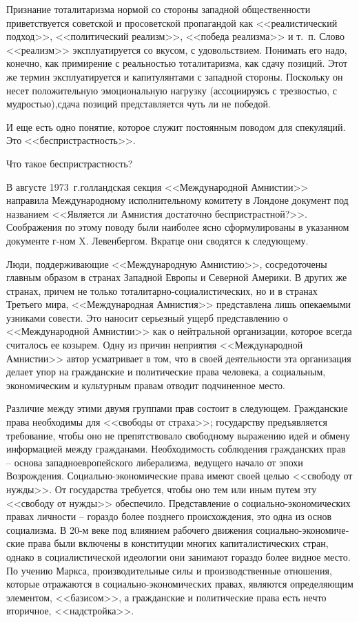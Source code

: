 \documentclass{book}
\begin{document}
Признание тоталитаризма нормой со стороны западной об­щественности приветствуется советской и просоветской про­пагандой как <<реалистический подход>>, <<политический реа­лизм>>, <<победа реализма>> и т.~п. Слово <<реализм>> эксплуати­руется со вкусом, с удовольствием. Понимать его надо, конеч­но, как примирение с реальностью тоталитаризма, как сдачу позиций. Этот же термин эксплуатируется и капитулянтами с западной стороны. Поскольку он несет положительную эмо­циональную нагрузку (ассоциируясь с трезвостью, с мудро­стью),сдача позиций представляется чуть ли не победой.

И еще есть одно понятие, которое служит постоянным пово­дом для спекуляций. Это <<беспристрастность>>.

Что такое беспристрастность?

В августе 1973~г.голландская секция <<Международной Ам­нистии>> направила Международному исполнительному комитету в Лондоне документ под названием <<Является ли Амнистия достаточно беспристрастной?>>. Соображения по этому поводу были наиболее ясно сформулированы в указанном документе г-ном X. Левенбергом.%
Вкратце они сводятся к следующему.

Люди, поддерживающие <<Международную Амнистию>>, сосре­доточены главным образом в странах Западной Европы и Се­верной Америки. В других же странах, причем не только тота­литарно-социалистических, но и в странах Третьего мира, <<Международная Амнистия>> представлена лишь опекаемыми узника­ми совести. Это наносит серьезный ущерб представлению о <<Международной Амнистии>> как о нейтральной организации, которое всегда считалось ее козырем. Одну из причин непри­ятия <<Международной Амнистии>> автор усматривает в том, что в своей деятельности эта организация делает упор на граждан­ские и политические права человека, а социальным, экономи­ческим и культурным правам отводит подчиненное место.

Различие между этими двумя группами прав состоит в сле­дующем. Гражданские права необходимы для <<свободы от страха>>; государству предъявляется требование, чтобы оно не препятствовало свободному выражению идей и обмену информацией между гражданами. Необходимость соблюде­ния гражданских прав -- основа западноевропейского либера­лизма, ведущего начало от эпохи Возрождения. Социально-экономические права имеют своей целью <<свободу от нуж­ды>>. От государства требуется, чтобы оно тем или иным пу­тем эту  <<свободу от нужды>> обеспечило. Представление о социально-экономических правах личности -- гораздо более позднего происхождения, это одна из основ социализма. В 20-м веке под влиянием рабочего движения социально-экономиче­ские права были включены в конституции многих капиталисти­ческих стран, однако в социалистической идеологии они зани­мают гораздо более видное место. По учению Маркса, произ­водительные силы и производственные отношения, которые отражаются в социально-экономических правах, являются 
определяющим 
элементом, <<базисом>>, а гражданские и поли­тические права есть нечто вторичное, <<надстройка>>.
\end{document}
